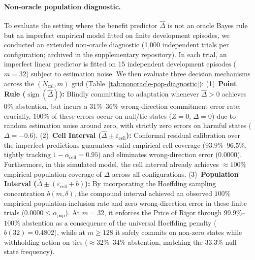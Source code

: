 \paragraph{Non-oracle population diagnostic.}
To evaluate the setting where the benefit predictor $\widehat\Delta$ is not an oracle Bayes rule but an imperfect empirical model fitted on finite development episodes, we conducted an extended non-oracle diagnostic (1{,}000 independent trials per configuration; archived in the supplementary repository).
In each trial, an imperfect linear predictor is fitted on 15 independent development episodes ($m=32$) subject to estimation noise. We then evaluate three decision mechanisms across the $(N_{\mathrm{cal}}, m)$ grid (Table~\ref{tab:nonoracle-pop-diagnostic}):
(1)~\textbf{Point Rule ($\operatorname{sign}(\widehat\Delta)$):} Blindly committing to adaptation whenever $\widehat\Delta > 0$ achieves $0\%$ abstention, but incurs a $31\%$--$36\%$ wrong-direction commitment error rate; crucially, $100\%$ of these errors occur on null/tie states ($Z=0$, $\Delta=0$) due to random estimation noise around zero, with strictly zero errors on harmful states ($\Delta = -0.6$).
(2)~\textbf{Cell Interval ($\widehat\Delta \pm \varepsilon_{\mathrm{cell}}$):} Conformal residual calibration over the imperfect predictions guarantees valid empirical cell coverage ($93.9\%$--$96.5\%$, tightly tracking $1-\alpha_{\mathrm{cell}} = 0.95$) and eliminates wrong-direction error ($0.0000$). Furthermore, in this simulated model, the cell interval already achieves $\approx 100\%$ empirical population coverage of $\Delta$ across all configurations.
(3)~\textbf{Population Interval ($\widehat\Delta \pm (\varepsilon_{\mathrm{cell}} + b)$):} By incorporating the Hoeffding sampling concentration $b(m, \delta)$, the compound interval achieved an observed $100\%$ empirical population-inclusion rate and zero wrong-direction error in these finite trials ($0.0000 \le \alpha_{\mathrm{pop}}$). At $m=32$, it enforces the Price of Rigor through $99.9\%$--$100\%$ abstention as a consequence of the universal Hoeffding penalty ($b(32) = 0.4802$), while at $m \ge 128$ it safely commits on non-zero states while withholding action on ties ($\approx 32\%$--$34\%$ abstention, matching the $33.3\%$ null state frequency).

